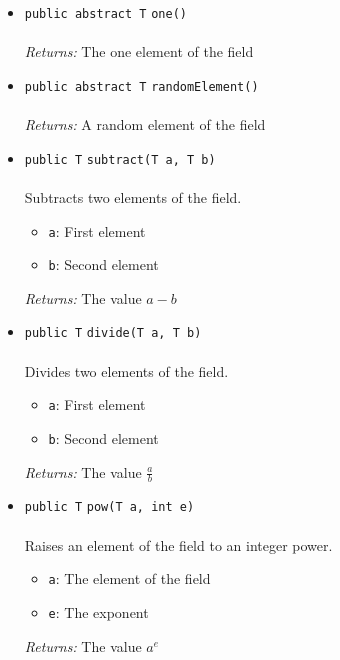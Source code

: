 \begin{itemize}
\item \lstinline|public abstract T| \lstinline|one|\lstinline|()|\\ \\[-0.6em]
\emph{Returns:} The one element of the field



\item \lstinline|public abstract T| \lstinline|randomElement|\lstinline|()|\\ \\[-0.6em]
\emph{Returns:} A random element of the field



\item \lstinline|public T| \lstinline|subtract|\lstinline|(T a, T b)|\\ \\[-0.6em]
Subtracts two elements of the field.
\begin{itemize}
\item \lstinline|a|: First element
\item \lstinline|b|: Second element
\end{itemize}

\emph{Returns:} The value $a - b$

\item \lstinline|public T| \lstinline|divide|\lstinline|(T a, T b)|\\ \\[-0.6em]
Divides two elements of the field.
\begin{itemize}
\item \lstinline|a|: First element
\item \lstinline|b|: Second element
\end{itemize}

\emph{Returns:} The value $\frac{a}{b}$

\item \lstinline|public T| \lstinline|pow|\lstinline|(T a, int e)|\\ \\[-0.6em]
Raises an element of the field to an integer power.
\begin{itemize}
\item \lstinline|a|: The element of the field
\item \lstinline|e|: The exponent
\end{itemize}

\emph{Returns:} The value $a^e$

\end{itemize}

